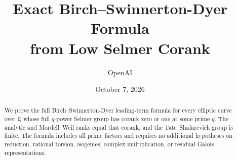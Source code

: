 \documentclass[11pt]{article}
\title{Exact Birch--Swinnerton-Dyer Formula\protect\\from Low Selmer Corank}
\author{OpenAI}
\date{October 7, 2026}
\numberwithin{equation}{section}
\theoremstyle{definition}
\theoremstyle{remark}
\newcommand{\Q}{\mathbb Q}
\begin{document}
\maketitle
\begin{abstract}
We prove the full Birch--Swinnerton-Dyer leading-term formula for every
elliptic curve over $\Q$ whose full $q$-power Selmer group has corank zero
or one at some prime $q$. The analytic and Mordell--Weil ranks equal
that corank, and the Tate--Shafarevich group is finite. The formula
includes all prime factors and requires no additional hypotheses on
reduction, rational torsion, isogenies, complex multiplication, or
residual Galois representations.
\end{abstract}
\tableofcontents











\end{document}
